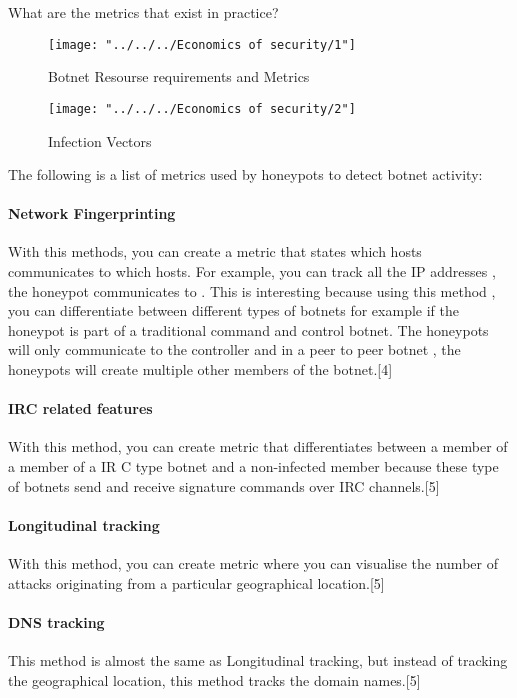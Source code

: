 What are the metrics that exist in practice?


\begin{figure}
\centering
\texttt{[image: "../../../Economics of security/1"]}
\caption{Botnet Resourse requirements and Metrics}
\label{fig:1}
\end{figure}
\begin{figure}
\centering
\texttt{[image: "../../../Economics of security/2"]}
\caption{Infection Vectors}
\label{fig:2}
\end{figure}


The following is a list of metrics used by honeypots to detect botnet activity:
\indent
\paragraph{Network Fingerprinting}
With this methods,  you can create a metric that states which hosts communicates to which hosts. For example, you can track all the IP addresses , the honeypot communicates to	. This is interesting because using this method , you can differentiate between different types of botnets for example if  the honeypot is part of a traditional command and control botnet. The honeypots will only communicate to the controller and  in a peer to peer botnet , the honeypots will create multiple other members of the botnet.[4]

\paragraph{IRC related features}
With this method, you can create metric that differentiates between a member of a member of a IR C type botnet and a non-infected member because these type of botnets  send and receive signature commands over IRC channels.[5]

\paragraph{Longitudinal tracking}
With this method, you can create metric where you can visualise the number of attacks originating from a particular geographical location.[5]

\paragraph{DNS tracking}
This method is almost the same as Longitudinal tracking, but instead of tracking the geographical location, this method tracks the domain names.[5]

